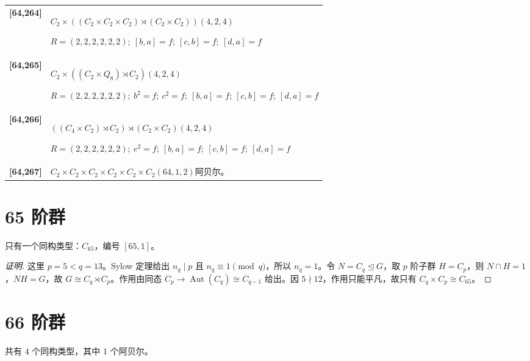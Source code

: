 \documentclass[UTF8,fontset=fandol,11pt,a4paper]{ctexart}
\newcommand{\Aut}{\operatorname{Aut}}\newcommand{\GL}{\operatorname{GL}}\newcommand{\ord}{\operatorname{ord}}\newcommand{\Z}{\mathrm Z}
\begin{document}
\begin{longtable}{@{}p{17mm}>{\raggedright\arraybackslash}p{141mm}@{}}
\textbf{[64,264]} & $C_{2}\times ((C_{2}\times C_{2}\times C_{2})\rtimes (C_{2}\times C_{2}))$\quad $(4,2,4)$\par\(R=(2,2,2,2,2,2);\allowbreak\ [b,a]=f;\allowbreak\ [c,b]=f;\allowbreak\ [d,a]=f\)\\[3pt]

\textbf{[64,265]} & $C_{2}\times ((C_{2}\times Q_{8})\rtimes C_{2})$\quad $(4,2,4)$\par\(R=(2,2,2,2,2,2);\allowbreak\ b^{2}=f;\allowbreak\ c^{2}=f;\allowbreak\ [b,a]=f;\allowbreak\ [c,b]=f;\allowbreak\ [d,a]=f\)\\[3pt]

\textbf{[64,266]} & $((C_{4}\times C_{2})\rtimes C_{2})\rtimes (C_{2}\times C_{2})$\quad $(4,2,4)$\par\(R=(2,2,2,2,2,2);\allowbreak\ e^{2}=f;\allowbreak\ [b,a]=f;\allowbreak\ [c,b]=f;\allowbreak\ [d,a]=f\)\\[3pt]

\textbf{[64,267]} & $C_{2}\times C_{2}\times C_{2}\times C_{2}\times C_{2}\times C_{2}$\quad $(64,1,2)$\quad 阿贝尔。\\[3pt]

\end{longtable}\endgroup

\section*{65 阶群}\label{order:65}

只有一个同构类型：$C_{65}$，编号 $[65,1]$。

\begin{proof}[证明]
这里 $p=5<q=13$。Sylow 定理给出 $n_q\mid p$ 且 $n_q\equiv1\pmod q$，所以 $n_q=1$。令 $N=C_q\trianglelefteq G$，取 $p$ 阶子群 $H=C_p$，则 $N\cap H=1$，$NH=G$，故 $G\cong C_q\rtimes C_p$。作用由同态 $C_p\to\Aut(C_q)\cong C_{q-1}$ 给出。因 $5\nmid 12$，作用只能平凡，故只有 $C_q\times C_p\cong C_{65}$。
\end{proof}

\section*{66 阶群}\label{order:66}

共有 $4$ 个同构类型，其中 $1$ 个阿贝尔。

\begingroup\small\setlength{\tabcolsep}{3pt}\renewcommand{\arraystretch}{1.12}
\end{document}

